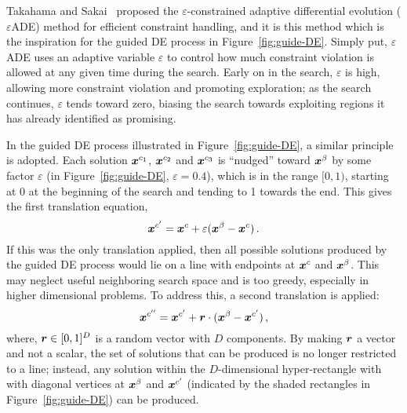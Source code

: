 Takahama and Sakai~\cite{takahama2010efficient} proposed the $\varepsilon$-constrained adaptive differential evolution ($\varepsilon$ADE) method for efficient constraint handling, and it is this method which is the inspiration for the guided DE process in Figure~\ref{fig:guide-DE}. Simply put, $\varepsilon$ADE uses an adaptive variable $\varepsilon$ to control how much constraint violation is allowed at any given time during the search. Early on in the search, $\varepsilon$ is high, allowing more constraint violation and promoting exploration; as the search continues, $\varepsilon$ tends toward zero, biasing the search towards exploiting regions it has already identified as promising.

In the guided DE process illustrated in Figure~\ref{fig:guide-DE}, a similar principle is adopted. Each solution $\boldsymbol{x}^{c_1}$, $\boldsymbol{x}^{c_2}$ and $\boldsymbol{x}^{c_3}$ is ``nudged'' toward $\boldsymbol{x}^\beta$ by some factor $\varepsilon$ (in Figure~\ref{fig:guide-DE}, $\varepsilon=0.4$), which is in the range $[0,1)$, starting at 0 at the beginning of the search and tending to 1 towards the end. This gives the first translation equation,
\begin{equation}\label{eq:nudge1}
\boldsymbol{x}^{c'} = \boldsymbol{x}^c + \varepsilon(\boldsymbol{x}^\beta - \boldsymbol{x}^c)\,.
\end{equation}
If this was the only translation applied, then all possible solutions produced by the guided DE process would lie on a line with endpoints at $\boldsymbol{x}^{c}$ and $\boldsymbol{x}^\beta$. This may neglect useful neighboring search space and is too greedy, especially in higher dimensional problems. To address this, a second translation is applied:
\begin{equation}\label{eq:nudge2}
\boldsymbol{x}^{c''} = \boldsymbol{x}^{c'} + \boldsymbol{r} \cdot (\boldsymbol{x}^\beta - \boldsymbol{x}^{c'})\,,
\end{equation}
where, $\boldsymbol{r}\in [0,1]^D$ is a random vector with $D$ components. By making $\boldsymbol{r}$ a vector and not a scalar, the set of solutions that can be produced is no longer restricted to a line; instead, any solution within the $D$-dimensional hyper-rectangle with with diagonal vertices at $\boldsymbol{x}^\beta$ and $\boldsymbol{x}^{c'}$ (indicated by the shaded rectangles in Figure~\ref{fig:guide-DE}) can be produced.

